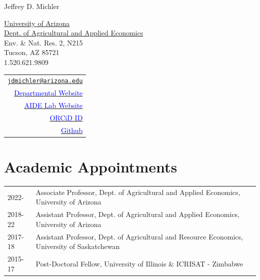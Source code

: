 \documentclass[letterpaper]{article}
\def\name{\sc Jeffrey D. Michler}
\begin{document}

\centerline{\huge \name}

\vspace{0.25in}

\begin{minipage}{0.72\linewidth}
	\href{https://www.arizona.edu/}{University of Arizona} \\
	\href{https://economics.arizona.edu/}{Dept. of Agricultural and Applied Economics} \\
	Env. \& Nat. Res. 2, N215 \\
	Tucson, AZ 85721  \\
	1.520.621.9809 \\
	
	
\end{minipage}
\begin{minipage}{0.28\linewidth}
	\begin{tabular}{r}
		\href{mailto:jdmichler@arizona.edu}{\tt jdmichler@arizona.edu} \\
		\href{https://economics.arizona.edu/person/jeffrey-d-michler}{\textcolor{Blue}{Departmental Website}} \\
		\href{https://aidelab.arizona.edu}{\textcolor{Blue}{AIDE Lab Website}} \\
		\href{https://orcid.org/0000-0001-7778-8703}{\textcolor{Blue}{ORCiD ID}} \\
		\href{https://github.com/jdavidm}{\textcolor{Blue}{Github}} \\
	\end{tabular}
\end{minipage}

\section*{\sc Academic Appointments}
\begin{tabular}{ll}
	2022-		& Associate Professor, Dept. of Agricultural and Applied Economics, University of Arizona	 \\
	2018-22		& Assistant Professor, Dept. of Agricultural and Applied Economics, University of Arizona	 \\
	2017-18		& Assistant Professor, Dept. of Agricultural and Resource Economics, University of Saskatchewan \\
	2015-17 	& Post-Doctoral Fellow, University of Illinois \& ICRISAT - Zimbabwe \\
\end{tabular}
\end{document}
